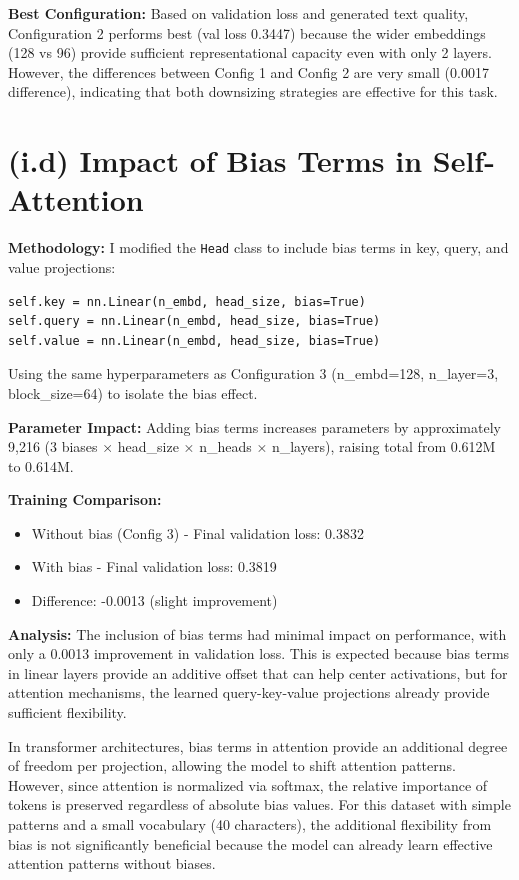 \documentclass[11pt]{article}
\begin{document}
\textbf{Best Configuration:} Based on validation loss and generated text quality, Configuration 2 performs best (val loss 0.3447) because the wider embeddings (128 vs 96) provide sufficient representational capacity even with only 2 layers. However, the differences between Config 1 and Config 2 are very small (0.0017 difference), indicating that both downsizing strategies are effective for this task.

\section*{(i.d) Impact of Bias Terms in Self-Attention}

\textbf{Methodology:} I modified the \texttt{Head} class to include bias terms in key, query, and value projections:

\begin{lstlisting}
self.key = nn.Linear(n_embd, head_size, bias=True)
self.query = nn.Linear(n_embd, head_size, bias=True)
self.value = nn.Linear(n_embd, head_size, bias=True)
\end{lstlisting}

Using the same hyperparameters as Configuration 3 (n\_embd=128, n\_layer=3, block\_size=64) to isolate the bias effect.

\textbf{Parameter Impact:} Adding bias terms increases parameters by approximately 9,216 (3 biases × head\_size × n\_heads × n\_layers), raising total from 0.612M to 0.614M.

\textbf{Training Comparison:}
\begin{itemize}
    \item Without bias (Config 3) - Final validation loss: 0.3832
    \item With bias - Final validation loss: 0.3819
    \item Difference: -0.0013 (slight improvement)
\end{itemize}

\textbf{Analysis:} The inclusion of bias terms had minimal impact on performance, with only a 0.0013 improvement in validation loss. This is expected because bias terms in linear layers provide an additive offset that can help center activations, but for attention mechanisms, the learned query-key-value projections already provide sufficient flexibility.

In transformer architectures, bias terms in attention provide an additional degree of freedom per projection, allowing the model to shift attention patterns. However, since attention is normalized via softmax, the relative importance of tokens is preserved regardless of absolute bias values. For this dataset with simple patterns and a small vocabulary (40 characters), the additional flexibility from bias is not significantly beneficial because the model can already learn effective attention patterns without biases.
\end{document}
